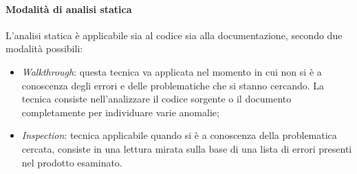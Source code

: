 \paragraph*{Modalità di analisi statica}
L'analisi statica è applicabile sia al codice sia alla documentazione, secondo due modalità possibili:
\begin{itemize}
  \item \textit{Walkthrough}: questa tecnica va applicata nel momento in cui non si è a conoscenza degli errori
			    e delle problematiche che si stanno cercando. La tecnica consiste nell'analizzare il 
			    codice sorgente o il documento completamente per individuare varie anomalie;
  \item \textit{Inspection}: tecnica applicabile quando si è a conoscenza della problematica cercata, consiste in una lettura
		    	     mirata sulla base di una lista di errori presenti nel prodotto esaminato.
\end{itemize}


